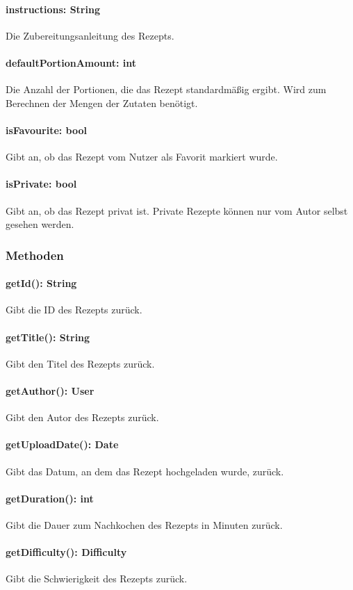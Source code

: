 \documentclass[parskip=full]{scrartcl}
\begin{document}
\paragraph{instructions: String}
Die Zubereitungsanleitung des Rezepts.
\paragraph{defaultPortionAmount: int}
Die Anzahl der Portionen, die das Rezept standardmäßig ergibt. Wird zum Berechnen der Mengen der Zutaten benötigt.
\paragraph{isFavourite: bool}
Gibt an, ob das Rezept vom Nutzer als Favorit markiert wurde.
\paragraph{isPrivate: bool}
Gibt an, ob das Rezept privat ist. Private Rezepte können nur vom Autor selbst gesehen werden.

\subsubsection{Methoden}
\paragraph{getId(): String}
Gibt die ID des Rezepts zurück.
\paragraph{getTitle(): String}
Gibt den Titel des Rezepts zurück.
\paragraph{getAuthor(): User}
Gibt den Autor des Rezepts zurück.
\paragraph{getUploadDate(): Date}
Gibt das Datum, an dem das Rezept hochgeladen wurde, zurück.
\paragraph{getDuration(): int}
Gibt die Dauer zum Nachkochen des Rezepts in Minuten zurück.
\paragraph{getDifficulty(): Difficulty}
Gibt die Schwierigkeit des Rezepts zurück.
\end{document}
